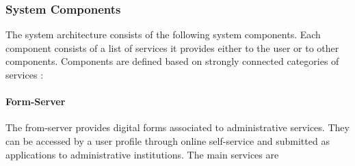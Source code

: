 \documentclass[
     12pt,         %
     a4paper,      %
     BCOR=10mm,version=first,     %
     DIV=14,version=first,        %
     ]{scrreprt}
\begin{document}
\subsubsection{System Components}
The system architecture consists of the following system components. Each component consists of a list of services it provides either to the user or to other components. Components are defined based on strongly connected categories of services \cite{NRW:Umsetzung}:

\paragraph{Form-Server}
The from-server provides digital forms associated to administrative services. They can be accessed by a user profile through online self-service and submitted as applications to administrative institutions. The main services are \cite{dNRW:Standardisierungskonzeptzur}
\end{document}
